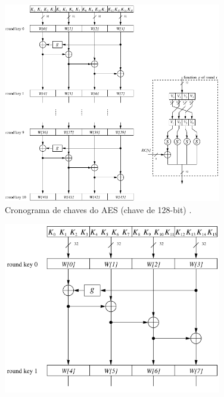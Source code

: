 \begin{frame}[allowframebreaks]
 \framebreak

\begin{figure}[h]
\centering
\includegraphics[width=0.85\textwidth,height=0.65\textheight,keepaspectratio]{figures/AES-keyschedule.png}
\caption{Cronograma de chaves do AES (chave de 128-bit) \cite{paar2014}.}
\label{fig-AES-keyschedule}
\end{figure}

 \framebreak

\begin{figure}[h]
\centering
\includegraphics[width=0.85\textwidth,height=0.65\textheight,keepaspectratio]{figures/AES-keyschedule-z.png}
\end{figure}


\end{frame}

